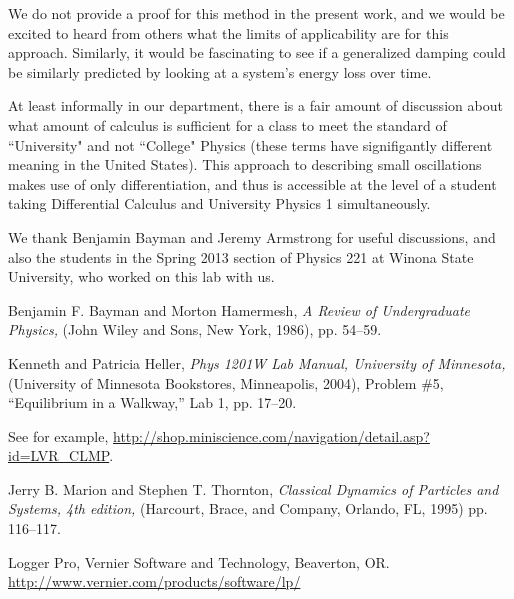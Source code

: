 \documentclass[12pt]{iopart}
\begin{document}
We do not provide a proof for this method in the present work, and we would be excited to heard from others what the limits of applicability are for this approach.  Similarly, it would be fascinating to see if a generalized  damping could be similarly predicted by looking at a system's energy loss over time.   

At least informally in our department, there is a fair amount of discussion about what amount of calculus is sufficient for a class to meet the standard of ``University" and not ``College" Physics (these terms have signifigantly different meaning in the United States).  This approach to describing small oscillations makes use of only differentiation, and thus is accessible at the level of a student taking Differential Calculus and University Physics 1 simultaneously. 

We thank Benjamin Bayman and Jeremy Armstrong for useful discussions, and also the students in the Spring 2013 section of Physics 221 at Winona State University, who worked on this lab with us.






\begin{thebibliography}{5}
 
Benjamin F. Bayman and Morton Hamermesh,
\textit{A Review of Undergraduate Physics,}
(John Wiley and Sons, New York, 1986),
pp. 54--59.

 Kenneth and Patricia Heller,
\textit{Phys 1201W Lab Manual, University of Minnesota,}
(University of Minnesota Bookstores, Minneapolis, 2004),
Problem \#5, ``Equilibrium in a Walkway,'' Lab 1, pp. 17--20.

See for example, \href{http://shop.miniscience.com/navigation/detail.asp?id=LVR_CLMP}{http://shop.miniscience.com/navigation/detail.asp?id=LVR\_CLMP}. 

Jerry B.  Marion and Stephen T. Thornton,
\textit{Classical Dynamics of Particles and Systems, 4th edition,}
(Harcourt, Brace, and Company, Orlando, FL, 1995)
pp. 116--117.

Logger Pro,
Vernier Software and Technology, 
Beaverton, OR.
\href{http://www.vernier.com/products/software/lp/}{http://www.vernier.com/products/software/lp/}


\end{thebibliography}
\end{document}
